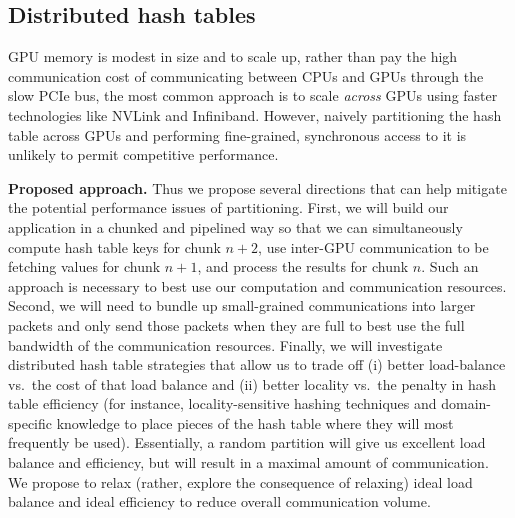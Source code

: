 \subsection{Distributed hash tables}

GPU memory is modest in size and to scale up, rather than pay the high communication cost of communicating between CPUs and GPUs through the slow PCIe bus, the most common approach is to scale \emph{across} GPUs using faster technologies like NVLink and Infiniband. However, naively partitioning the hash table across GPUs and performing fine-grained, synchronous access to it is unlikely to permit competitive performance.

\noindent
{\bf Proposed approach.}
Thus we propose several directions that can help mitigate the potential performance issues of partitioning. First, we will build our application in a chunked and pipelined way so that we can simultaneously compute hash table keys for chunk $n+2$, use inter-GPU communication to be fetching values for chunk $n+1$, and process the results for chunk $n$. Such an approach is necessary to best use our computation and communication resources. Second, we will need to bundle up small-grained communications into larger packets and only send those packets when they are full to best use the full bandwidth of the communication resources. Finally, we will investigate distributed hash table strategies that allow us to trade off (i) better load-balance vs.\ the cost of that load balance and (ii) better locality vs.\ the penalty in hash table efficiency (for instance, locality-sensitive hashing techniques and domain-specific knowledge to place pieces of the hash table where they will most frequently be used).    Essentially, a random partition will give us excellent load balance and efficiency, but will result in a maximal amount of communication. We propose to relax (rather, explore the consequence of relaxing) ideal load balance and ideal efficiency to reduce overall communication volume.






